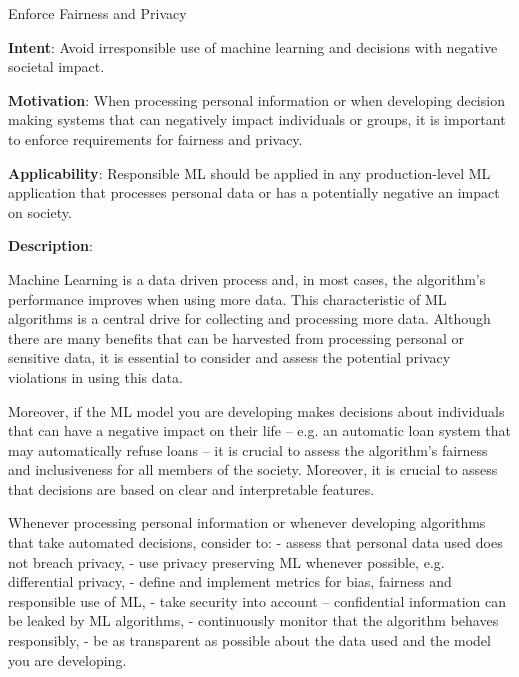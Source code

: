   
  \begin{frame}[plain]{ Enforce Fairness and Privacy
 }

  \textbf{Intent}: Avoid irresponsible use of machine learning and decisions with negative societal impact. 
 

  \textbf{Motivation}: When processing personal information or when developing decision making systems that can negatively impact individuals or groups, it is important to enforce requirements for fairness and privacy. 
 

  \textbf{Applicability}: Responsible ML should be applied in any production-level ML application that processes personal data or has a potentially negative an impact on society.
 

  \textbf{Description}: 

Machine Learning is a data driven process and, in most cases, the algorithm's performance improves when using more data.
This characteristic of ML algorithms is a central drive for collecting and processing more data.
Although there are many benefits that can be harvested from processing personal or sensitive data, it is essential to consider and assess the potential privacy violations in using this data.


Moreover, if the ML model you are developing makes decisions about individuals that can have a negative impact on their life -- e.g. an automatic loan system that may automatically refuse loans -- it is crucial to assess the algorithm's fairness and inclusiveness for all members of the society.
Moreover, it is crucial to assess that decisions are based on clear and interpretable features.


Whenever processing personal information or whenever developing algorithms that take automated decisions, consider to:
- assess that personal data used does not breach privacy,
- use privacy preserving ML whenever possible, e.g. differential privacy,
- define and implement metrics for bias, fairness and responsible use of ML,
- take security into account -- confidential information can be leaked by ML algorithms,
- continuously monitor that the algorithm behaves responsibly,
- be as transparent as possible about the data used and the model you are developing.


 


  \end{frame}

